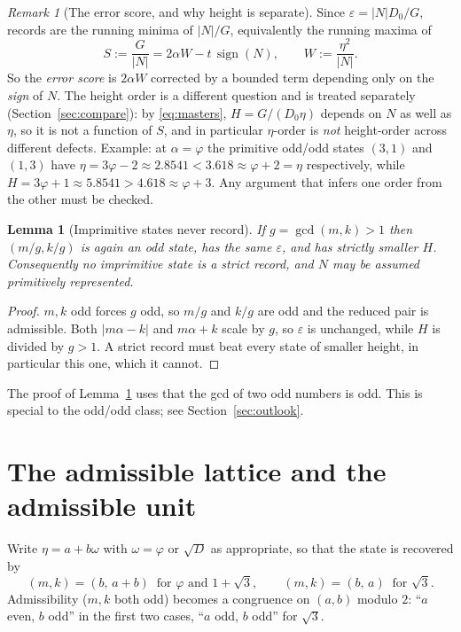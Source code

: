 \documentclass[11pt]{article}
\newtheorem{lemma}[theorem]{Lemma}
\theoremstyle{definition}
\theoremstyle{remark}
\newtheorem{remark}[theorem]{Remark}
\DeclareMathOperator{\sgn}{sign}
\begin{document}
\begin{remark}[The error score, and why height is separate]\label{rem:score}
Since $\varepsilon=|N|D_0/G$, records are the running minima of $|N|/G$, equivalently the
running maxima of
\[
S:=\frac{G}{|N|}=2\alpha W-t\,\sgn(N),\qquad W:=\frac{\eta^2}{|N|} .
\]
So the \emph{error score} is $2\alpha W$ corrected by a bounded term depending only on the
\emph{sign} of $N$. The height order is a different question and is treated separately
(Section~\ref{sec:compare}): by \eqref{eq:masters}, $H=G/(D_0\eta)$ depends on $N$ as well as
$\eta$, so it is not a function of $S$, and in particular $\eta$-order is \emph{not}
height-order across different defects. Example: at $\alpha=\varphi$ the primitive odd/odd
states $(3,1)$ and $(1,3)$ have
$\eta=3\varphi-2\approx2.8541<3.618\approx\varphi+2=\eta$ respectively, while
$H=3\varphi+1\approx5.8541>4.618\approx\varphi+3$. Any argument that infers one order from the
other must be checked.
\end{remark}

\begin{lemma}[Imprimitive states never record]\label{lem:imprim}
If $g=\gcd(m,k)>1$ then $(m/g,k/g)$ is again an odd state, has the same $\varepsilon$, and has
strictly smaller $H$. Consequently no imprimitive state is a strict record, and $N$ may be
assumed primitively represented.
\end{lemma}

\begin{proof}
$m,k$ odd forces $g$ odd, so $m/g$ and $k/g$ are odd and the reduced pair is admissible. Both
$|m\alpha-k|$ and $m\alpha+k$ scale by $g$, so $\varepsilon$ is unchanged, while
$H$ is divided by $g>1$. A strict record must beat every state of smaller height, in
particular this one, which it cannot.
\end{proof}

The proof of Lemma~\ref{lem:imprim} uses that the gcd of two odd numbers is odd. This is
special to the odd/odd class; see Section~\ref{sec:outlook}.

\section{The admissible lattice and the admissible unit}\label{sec:lattice}

Write $\eta=a+b\omega$ with $\omega=\varphi$ or $\sqrt{D}$ as appropriate, so that the state is
recovered by
\[
(m,k)=(b,\,a+b)\ \text{ for }\varphi\text{ and }1+\sqrt3,\qquad (m,k)=(b,\,a)\ \text{ for }\sqrt3 .
\]
Admissibility ($m,k$ both odd) becomes a congruence on $(a,b)$ modulo $2$: ``$a$ even, $b$
odd'' in the first two cases, ``$a$ odd, $b$ odd'' for $\sqrt3$.
\end{document}
